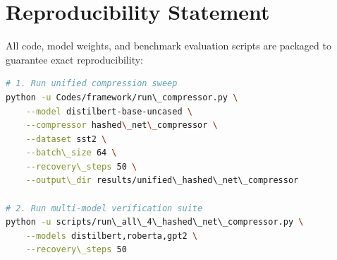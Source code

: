 \section{Reproducibility Statement}
All code, model weights, and benchmark evaluation scripts are packaged to guarantee exact reproducibility:
\begin{lstlisting}[language=bash]
# 1. Run unified compression sweep
python -u Codes/framework/run\_compressor.py \
    --model distilbert-base-uncased \
    --compressor hashed\_net\_compressor \
    --dataset sst2 \
    --batch\_size 64 \
    --recovery\_steps 50 \
    --output\_dir results/unified\_hashed\_net\_compressor

# 2. Run multi-model verification suite
python -u scripts/run\_all\_4\_hashed\_net\_compressor.py \
    --models distilbert,roberta,gpt2 \
    --recovery\_steps 50
\end{lstlisting}
